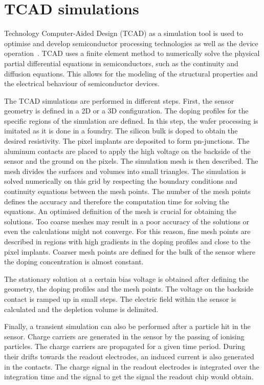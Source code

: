 \section{TCAD simulations}
\label{sec:TCAD}
Technology Computer-Aided Design (TCAD) as a simulation tool is used
to optimise and develop semiconductor processing technologies as well
as the device operation~\cite{synopsysTCAD}. TCAD uses a finite
element method to numerically solve the physical partial differential
equations in semiconductors, such as the continuity and diffusion
equations. This allows for the modeling of the structural properties
and the electrical behaviour of semiconductor devices.

The TCAD simulations are performed in different steps. First, the
sensor geometry is defined in a 2D or a 3D configuration. The doping
profiles for the specific regions of the simulation are defined. In
this step, the wafer processing is imitated as it is done in a
foundry. The silicon bulk is doped to obtain the desired
resistivity. The pixel implants are deposited to form
pn-junctions. The aluminum contacts are placed to apply the high
voltage on the backside of the sensor and the ground on the
pixels. The simulation mesh is then described. The mesh divides the
surfaces and volumes into small triangles. The simulation is solved
numerically on this grid by respecting the boundary conditions and
continuity equations between the mesh points. The number of the mesh
points defines the accuracy and therefore the computation time for
solving the equations. An optimised definition of the mesh is crucial
for obtaining the solutions. Too coarse meshes may result in a poor
accuracy of the solutions or even the calculations might not
converge. For this reason, fine mesh points are described in regions
with high gradients in the doping profiles and close to the pixel
implants. Coarser mesh points are defined for the bulk of the sensor
where the doping concentration is almost constant.

The stationary solution at a certain bias voltage is obtained after
defining the geometry, the doping profiles and the mesh points. The
voltage on the backside contact is ramped up in small steps. The
electric field within the sensor is calculated and the depletion
volume is delimited.

Finally, a transient simulation can also be performed after a particle
hit in the sensor. Charge carriers are generated in the sensor by the
passing of ionising particles. The charge carriers are propagated for
a given time period. During their drifts towards the readout
electrodes, an induced current is also generated in the contacts. The
charge signal in the readout electrodes is integrated over the
integration time and the signal to get the signal the readout chip
would obtain.

